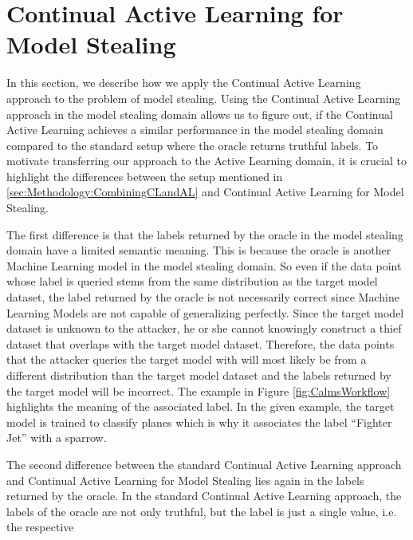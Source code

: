 \section{Continual Active Learning for Model Stealing}
\label{sec:Methodolody:CALMS}
In this section, we describe how we apply the Continual Active Learning approach to the problem of model stealing. Using the Continual Active Learning approach
in the model stealing domain allows us to figure out, if the Continual Active Learning achieves a similar performance in the model stealing domain compared to
the standard setup where the oracle returns truthful labels. To motivate transferring our approach to the Active Learning domain, it is crucial to highlight the
differences between the setup mentioned in \ref{sec:Methodology:CombiningCLandAL} and Continual Active Learning for Model Stealing. \par
The first difference is that the labels returned by the oracle in the model stealing domain have a limited semantic meaning. This is because the oracle is another
Machine Learning model in the model stealing domain. So even if the data point whose label is queried stems from the same distribution as the target model dataset,
the label returned by the oracle is not necessarily correct since Machine Learning Models are not capable of generalizing perfectly. Since the target model dataset
is unknown to the attacker, he or she cannot knowingly construct a thief dataset that overlaps with the target model dataset. Therefore, the data points that the
attacker queries the target model with will most likely be from a different distribution than the target model dataset and the labels returned by the target model
will be incorrect. The example in Figure \ref{fig:CalmsWorkflow} highlights the meaning of the associated label. In the given example, the target model is trained
to classify planes which is why it associates the label \enquote{Fighter Jet} with a sparrow. \par
The second difference between the standard Continual Active Learning approach and Continual Active Learning for Model Stealing lies again in the labels returned by
the oracle. In the standard Continual Active Learning approach, the labels of the oracle are not only truthful, but the label is just a single value, i.e. the respective
